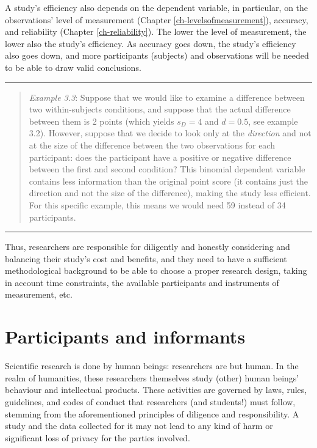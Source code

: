 \documentclass[
]{book}
\begin{document}
A study's efficiency also depends on the dependent variable, in particular, on the observations' level of measurement (Chapter \ref{ch-levelsofmeasurement}), accuracy, and reliability (Chapter \ref{ch-reliability}). The lower the level of measurement, the lower also the study's efficiency. As accuracy goes down, the study's efficiency also goes down, and more participants (subjects) and observations will be needed to be able to draw valid conclusions.

\begin{center}\rule{0.5\linewidth}{0.5pt}\end{center}

\begin{quote}
\emph{Example 3.3}: Suppose that we would like to examine a difference between two within-subjects conditions, and suppose that the actual difference between them is 2 points (which yields \(s_D = 4\) and \(d = 0.5\), see example 3.2). However, suppose that we decide to look only at the \emph{direction} and not at the size of the difference between the two observations for each participant: does the participant have a positive or negative difference between the first and second condition? This binomial dependent variable contains less information than the original point score (it contains just the direction and not the size of the difference), making the study less efficient. For this specific example, this means we would need 59 instead of 34 participants.
\end{quote}

\begin{center}\rule{0.5\linewidth}{0.5pt}\end{center}

Thus, researchers are responsible for diligently and honestly considering and balancing their study's cost and benefits, and they need to have a sufficient methodological background to be able to choose a proper research design, taking in account time constraints, the available participants and instruments of measurement, etc.

\section{Participants and informants}\label{participants-and-informants}

Scientific research is done by human beings: researchers are but human. In the realm of humanities, these researchers themselves study (other) human beings' behaviour and intellectual products. These activities are governed by laws, rules, guidelines, and codes of conduct that researchers (and students!) must follow, stemming from the aforementioned principles of diligence and responsibility. A study and the data collected for it may not lead to any kind of harm or significant loss of privacy for the parties involved.
\end{document}
